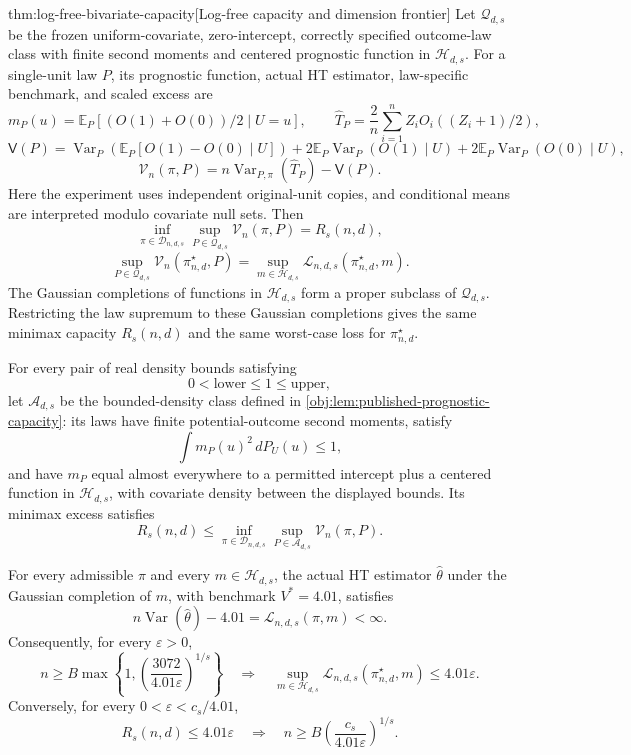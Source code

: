 \begin{theoremv}{thm:log-free-bivariate-capacity}[Log-free capacity and dimension frontier]
Let \(\mathcal Q_{d,s}\) be the frozen uniform-covariate, zero-intercept, correctly specified outcome-law class with finite second moments and centered prognostic function in \(\mathcal H_{d,s}\). For a single-unit law \(P\), its prognostic function, actual HT estimator, law-specific benchmark, and scaled excess are
\[
m_P(u)=\mathbb E_P[(O(1)+O(0))/2\mid U=u],
\qquad
\widehat T_P=\frac2n\sum_{i=1}^n
 Z_iO_i((Z_i+1)/2),
\]
\[
\mathsf V(P)
=\operatorname{Var}_P\!\left(
 \mathbb E_P[O(1)-O(0)\mid U]\right)
+2\mathbb E_P\operatorname{Var}_P(O(1)\mid U)
+2\mathbb E_P\operatorname{Var}_P(O(0)\mid U),
\]
\[
\mathcal V_n(\pi,P)
=n\operatorname{Var}_{P,\pi}(\widehat T_P)-\mathsf V(P).
\]
Here the experiment uses independent original-unit copies, and conditional means are interpreted modulo covariate null sets. Then
\[
\inf_{\pi\in\mathcal D_{n,d,s}}
 \sup_{P\in\mathcal Q_{d,s}}\mathcal V_n(\pi,P)
=R_s(n,d),
\]
\[
\sup_{P\in\mathcal Q_{d,s}}
 \mathcal V_n(\pi^\star_{n,d},P)
=
\sup_{m\in\mathcal H_{d,s}}
 \mathcal L_{n,d,s}(\pi^\star_{n,d},m).
\]
The Gaussian completions of functions in \(\mathcal H_{d,s}\) form a proper subclass of \(\mathcal Q_{d,s}\). Restricting the law supremum to these Gaussian completions gives the same minimax capacity \(R_s(n,d)\) and the same worst-case loss for \(\pi^\star_{n,d}\).

For every pair of real density bounds satisfying
\[
0<\mathrm{lower}\leq1\leq\mathrm{upper},
\]
let \(\mathcal A_{d,s}\) be the bounded-density class defined in \cref{obj:lem:published-prognostic-capacity}: its laws have finite potential-outcome second moments, satisfy
\[
\int m_P(u)^2\,dP_U(u)\leq1,
\]
and have \(m_P\) equal almost everywhere to a permitted intercept plus a centered function in \(\mathcal H_{d,s}\), with covariate density between the displayed bounds. Its minimax excess satisfies
\[
R_s(n,d)
\leq
\inf_{\pi\in\mathcal D_{n,d,s}}
 \sup_{P\in\mathcal A_{d,s}}\mathcal V_n(\pi,P).
\]

For every admissible \(\pi\) and every \(m\in\mathcal H_{d,s}\), the actual HT estimator \(\widehat\theta\) under the Gaussian completion of \(m\), with benchmark \(V^*=4.01\), satisfies
\[
n\operatorname{Var}(\widehat\theta)-4.01
=\mathcal L_{n,d,s}(\pi,m)<\infty.
\]
Consequently, for every \(\varepsilon>0\),
\[
n\geq B\max\!\left\{
1,\left(\frac{3072}{4.01\varepsilon}\right)^{1/s}
\right\}
\quad\Longrightarrow\quad
\sup_{m\in\mathcal H_{d,s}}
 \mathcal L_{n,d,s}(\pi^\star_{n,d},m)
\leq4.01\varepsilon.
\]
Conversely, for every \(0<\varepsilon<c_s/4.01\),
\[
R_s(n,d)\leq4.01\varepsilon
\quad\Longrightarrow\quad
n\geq B\left(\frac{c_s}{4.01\varepsilon}\right)^{1/s}.
\]


\end{theoremv}
